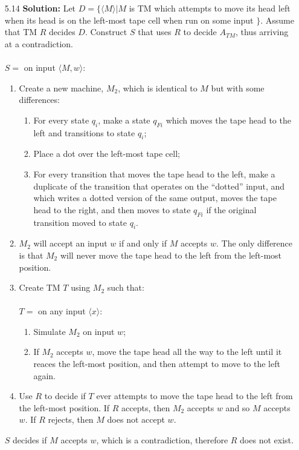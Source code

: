 \documentclass{article}
\begin{document}
\begin{enumerate}
    \item[5.14] \textbf{Solution:}
    Let $D = \{\langle M\rangle | M $ is TM which attempts to move its head left when its head is on the left-most tape cell when run on some input $\}$. Assume that TM $R$ decides $D$. Construct $S$ that uses $R$ to decide $A_{TM}$, thus arriving at a contradiction. \\ \\
    $S = $ on input $\langle M, w\rangle$:
    \begin{enumerate}
        \item Create a new machine, $M_{2}$, which is identical to $M$ but with some differences:
        \begin{enumerate}
            \item For every state $q_{i}$, make a state $q_{Fi}$ which moves the tape head to the left and transitions to state $q_{i}$;
            \item Place a dot over the left-most tape cell;
            \item For every transition that moves the tape head to the left, make a duplicate of the transition that operates on the ``dotted'' input, and which writes a dotted version of the same output, moves the tape head to the right, and then moves to state $q_{Fi}$ if the original transition moved to state $q_{i}$.
        \end{enumerate}
        \item $M_{2}$ will accept an input $w$ if and only if $M$ accepts $w$. The only difference is that $M_{2}$ will never move the tape head to the left from the left-most position. 
        \item Create TM $T$ using $M_{2}$ such that: \\ \\
        $T = $ on any input $\langle x \rangle$:
        \begin{enumerate}
            \item Simulate $M_{2}$ on input $w$;
            \item If $M_{2}$ accepts $w$, move the tape head all the way to the left until it reaces the left-most position, and then attempt to move to the left again.
        \end{enumerate}
        \item Use $R$ to decide if $T$ ever attempts to move the tape head to the left from the left-most position. If $R$ accepts, then $M_{2}$ accepts $w$ and so $M$ accepts $w$. If $R$ rejects, then $M$ does not accept $w$.
    \end{enumerate}
    $S$ decides if $M$ accepts $w$, which is a contradiction, therefore $R$ does not exist.


\end{enumerate}
\end{document}
